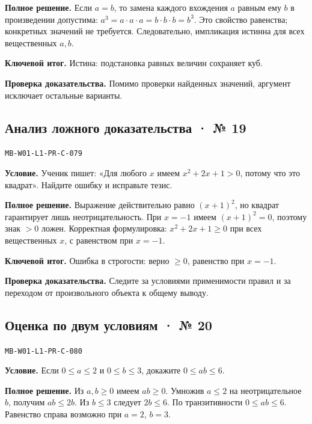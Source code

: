\documentclass[11pt,a4paper,openany]{book}
\newcommand{\muid}[1]{\texttt{\footnotesize #1}}
\begin{document}
\textbf{Полное решение.} Если $a=b$, то замена каждого вхождения $a$ равным ему $b$ в произведении допустима: $a^3=a\cdot a\cdot a=b\cdot b\cdot b=b^3$. Это свойство равенства; конкретных значений не требуется. Следовательно, импликация истинна для всех вещественных $a,b$.


\begin{learnbox}\textbf{Ключевой итог.} Истина: подстановка равных величин сохраняет куб.\par \textbf{Проверка доказательства.} 
Помимо проверки найденных значений, аргумент исключает остальные варианты. 
\end{learnbox}

\subsection*{Анализ ложного доказательства · № 19}\hypertarget{solution:MB-W01-L1-PR-C-079}{}

\muid{MB-W01-L1-PR-C-079}\par

\textbf{Условие.} Ученик пишет: «Для любого $x$ имеем $x^2+2x+1>0$, потому что это квадрат». Найдите ошибку и исправьте тезис.\par

\textbf{Полное решение.} Выражение действительно равно $(x+1)^2$, но квадрат гарантирует лишь неотрицательность. При $x=-1$ имеем $(x+1)^2=0$, поэтому знак $>0$ ложен. Корректная формулировка: $x^2+2x+1\ge0$ при всех вещественных $x$, с равенством при $x=-1$.


\begin{learnbox}\textbf{Ключевой итог.} Ошибка в строгости: верно $\ge0$, равенство при $x=-1$.\par \textbf{Проверка доказательства.} 
Следите за условиями применимости правил и за переходом от произвольного объекта к общему выводу. 
\end{learnbox}

\subsection*{Оценка по двум условиям · № 20}\hypertarget{solution:MB-W01-L1-PR-C-080}{}

\muid{MB-W01-L1-PR-C-080}\par

\textbf{Условие.} Если $0\le a\le2$ и $0\le b\le3$, докажите $0\le ab\le6$.\par

\textbf{Полное решение.} Из $a,b\ge0$ имеем $ab\ge0$. Умножив $a\le2$ на неотрицательное $b$, получим $ab\le2b$. Из $b\le3$ следует $2b\le6$. По транзитивности $0\le ab\le6$. Равенство справа возможно при $a=2$, $b=3$.
\end{document}
